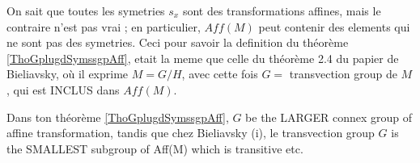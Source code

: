 \begin{enumerate}
On sait que toutes les symetries $s_x$ sont des transformations affines, mais le contraire n’est pas vrai ; en particulier, $Aff(M)$  peut contenir des elements qui ne sont pas des symetries.  Ceci pour savoir la definition du théorème  \ref{ThoGplugdSymssgpAff}, etait la meme que celle du théorème 2.4 du papier de Bieliavsky, où il exprime $M=G/H$, avec cette fois $G =$ transvection group de $M$, qui est INCLUS dans $Aff(M)$. 

Dans ton théorème \ref{ThoGplugdSymssgpAff}, $G$ be the LARGER connex group of affine transformation, tandis que chez Bieliavsky (i), le transvection group $G$ is the SMALLEST subgroup of Aff(M) which is transitive etc.

\end{enumerate}
